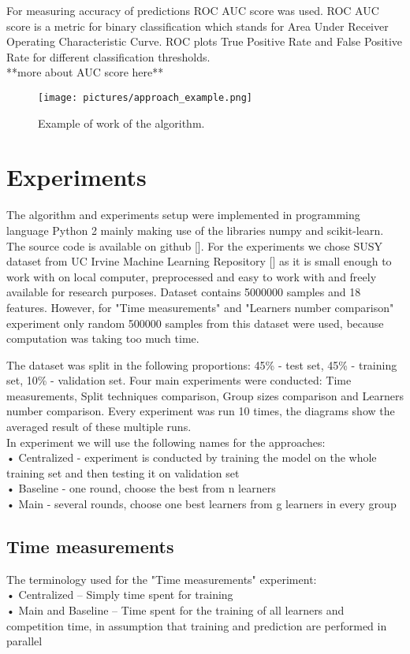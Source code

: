 \documentclass{scrartcl}
\begin{document}
For measuring accuracy of predictions ROC AUC score was used. ROC AUC score is a metric for binary classification which stands for Area Under Receiver Operating Characteristic Curve. ROC plots True Positive Rate and False Positive Rate for different classification thresholds. \\
**more about AUC score here**


\begin{figure}[t]
  \texttt{[image: pictures/approach\_example.png]}
  \caption{Example of work of the algorithm.}
  \label{fig:approach_example}
\end{figure}





\section{Experiments}
The algorithm and experiments setup were implemented in programming language Python 2 mainly making use of  the libraries numpy and scikit-learn. The source code is available on github []. For the experiments we chose SUSY dataset from UC Irvine Machine Learning Repository [] as it is small enough to work with on local computer, preprocessed and easy to work with and freely available for research purposes. Dataset contains 5000000 samples and 18 features. However, for "Time measurements" and "Learners number comparison" experiment only random 500000 samples from this dataset were used, because computation was taking too much time. 

The dataset was split in the following proportions: 45\% - test set, 45\% - training set, 10\% - validation set. Four main experiments were conducted: Time measurements, Split techniques comparison, Group sizes comparison and Learners number comparison. Every experiment was run 10 times, the diagrams show the averaged result of these multiple runs. \\
In experiment we will use the following names for the approaches: \\
• Centralized - experiment is conducted by training the model on the whole training set and then testing it on validation set\\
• Baseline - one round, choose the best from n learners\\
• Main - several rounds, choose one best learners from g learners in every group\\

\subsection{Time measurements}
The terminology used for the "Time measurements" experiment: \\
•	Centralized – Simply time spent for training \\
•	Main and Baseline – Time spent for the training of all learners and competition time, in assumption that training and prediction are performed in parallel \\
\end{document}
